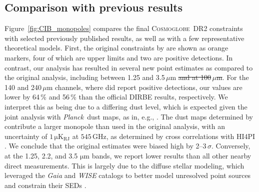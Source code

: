 \documentclass{aa}
\def\Planck{\textit{Planck}}
\newcommand{\cosmoglobe}{\textsc{Cosmoglobe}}
\def\Planck{\textit{Planck}}
\begin{document}
\subsection{Comparison with previous results}

Figure~\ref{fig:CIB_monopoles} compares the final \cosmoglobe\ DR2
constraints with selected previously published results, as well as
with a few representative theoretical models. First, the original
constraints by \citet{hauser1998} are shown as orange markers, four 
of which are upper limits and two are positive detections. In
contrast, our analysis has resulted in several new point estimates as
compared to the original analysis, including between 1.25 and
3.5$\,\mu$m\sout{ and at 100$\,\mu$m}.
For the 140 and 240$\,\mu\mathrm{m}$ channels, where
\citet{hauser1998} did report positive detections, our values are lower by
64\,\% and 56\,\% than the official DIRBE results, respectively. 
We interpret this as being due to a differing dust level, which is expected
given the joint analysis with \Planck\ dust maps, as in, e.g.,
\citet{odegard:2019}. The dust maps determined by \citet{CG02_06}
contribute a larger monopole than used in the original \citet{hauser1998}
analysis, with an uncertainty of $1\,\mathrm{\mu K_{RJ}}$ at
$545\,\mathrm{GHz}$, as determined by cross correlations with HI4PI \citep{HI4PI2016}. We conclude that the original estimates were biased
high by 2--$3\,\sigma$.
Conversely, at the 1.25, 2.2, and 3.5 $\mathrm{\mu m}$ bands, we report lower results than all other nearby direct measurements. This is largely due to the diffuse stellar modeling, which leveraged the \textit{Gaia} and \textit{WISE} catalogs to better model unresolved point sources and constrain their SEDs \citep{CG02_04}.
\end{document}
